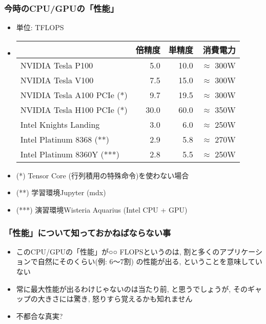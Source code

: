 \documentclass[10pt,dvipdfmx]{beamer}
\begin{document}
\begin{frame}
  \frametitle{今時のCPU/GPUの「性能」}
  \begin{itemize}
  \item 単位: TFLOPS
    
  \item []
    {\small
\begin{tabular}{|l|r|r|r|}\hline
                      & 倍精度 & 単精度 & 消費電力 \\\hline
NVIDIA Tesla P100     & 5.0    & 10.0   & $\approx$ 300W \\
NVIDIA Tesla V100     & 7.5    & 15.0   & $\approx$ 300W \\    
NVIDIA Tesla A100 PCIe (*) & 9.7    & 19.5   & $\approx$ 300W \\    
NVIDIA Tesla H100 PCIe (*) & 30.0  & 60.0   & $\approx$ 350W \\    
Intel Knights Landing & 3.0    & 6.0    & $\approx$ 250W \\
Intel Platinum 8368 (**) & 2.9 & 5.8  & $\approx$ 270W \\
Intel Platinum 8360Y (***) & 2.8 & 5.5  & $\approx$ 250W \\\hline
\end{tabular}}
\item (*) Tensor Core (行列積用の特殊命令)を使わない場合
\item (**) 学習環境Jupyter (mdx)
\item (***) 演習環境Wisteria Aquarius (Intel CPU + GPU)
\end{itemize}
\end{frame}

\begin{frame}
  \frametitle{「性能」について知っておかねばならない事}
  \begin{itemize}
  \item<1-> このCPU/GPUの「性能」が○○ FLOPSというのは,
    割と多くのアプリケーションで自然にそのくらい(例: 6〜7割)
    の性能が出る, ということを意味していない
  \item<2-> 常に最大性能が出るわけじゃないのは当たり前, と思うでしょうが,
    そのギャップの大きさには驚き, 怒りすら覚えるかも知れません
  \item<3-> 不都合な真実?
  \end{itemize}
\end{frame}
\end{document}
